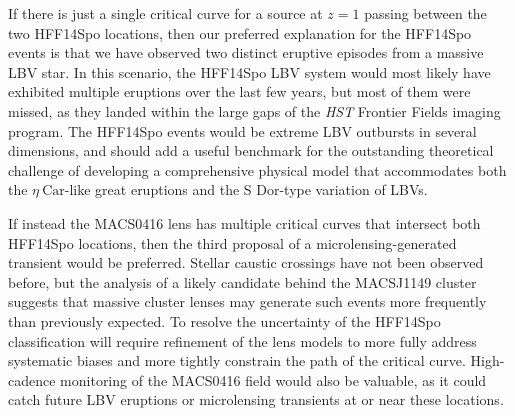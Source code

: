 \documentclass{article}
\providecommand\citep{\cite}
\def\etacar{\ensuremath{\eta~\mbox{Car}}\xspace}
\def\HST{{\it HST}\xspace}
\def\spock{HFF14Spo\xspace}
\def\macs0416{MACS0416\xspace}
\begin{document}
If there is just a single critical curve for a source at $z=1$ passing
between the two \spock locations, then our preferred explanation for
the \spock events is that we have observed two distinct eruptive
episodes from a massive LBV star. In this scenario, the \spock LBV
system would most likely have exhibited multiple eruptions over the
last few years, but most of them were missed, as they landed within
the large gaps of the \HST Frontier Fields imaging program. The \spock
events would be extreme LBV outbursts in several dimensions, and
should add a useful benchmark for the outstanding theoretical
challenge of developing a comprehensive physical model that
accommodates both the \etacar-like great eruptions and the S Dor-type
variation of LBVs.

If instead the \macs0416 lens has multiple critical curves that
intersect both \spock locations, then the third proposal of a
microlensing-generated transient would be preferred.  Stellar caustic
crossings have not been observed before, but the analysis of a likely
candidate behind the MACSJ1149 cluster\citep{Kelly:2017} suggests that massive cluster
lenses may generate such events more frequently than previously
expected\citep{Kelly:2017, Diego:2017}. To resolve the uncertainty of
the \spock classification will require refinement of the lens models
to more fully address systematic biases and more tightly constrain the
path of the critical curve.  High-cadence monitoring of the \macs0416
field would also be valuable, as it could catch future LBV eruptions
or microlensing transients at or near these locations.


\medskip
\end{document}
